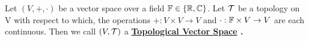 \label{def:topologicalvectorspace}
\newcommand{\TVS}[0]{
    \bf \hyperref[def:topologicalvectorspace]{Topological Vector Space} \rm
}

\begin{df}
Let $(V,+,\cdot)$ be a vector space over a field $\mathbb{F} \in \{\mathbb{R}, \mathbb{C}\}$. 
Let $\mathcal{T}$ be a topology on V with respect to which, the operations
$+:V \times V \to V$ 
and
$\cdot: \mathbb{F} \times V \to V$ are each continuous. 
Then we call $(V,\mathcal{T})$ a \TVS. 
\end{df}
